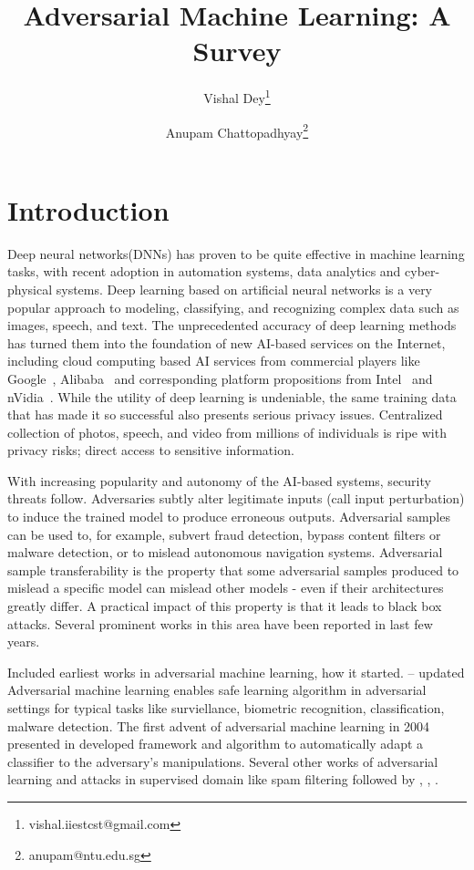 \documentclass{article}
\title{Adversarial Machine Learning: A Survey}
\author[1]{Vishal Dey\thanks{vishal.iiestcst@gmail.com}}
\author[2]{Anupam Chattopadhyay\thanks{anupam@ntu.edu.sg}}
\affil[1]{Department of Computer Science and Technology,  Indian Institute of Engineering Science and Technology, Shibpur}
\affil[2]{School of Computer Science and Engineering, Nanyang Technological University, Singapore}
\newcommand{\ach}[1]{{\color{red}#1}}
\begin{document}
	\maketitle
	
\section{Introduction}
Deep neural networks(DNNs) has proven to be quite effective in machine learning tasks, with recent adoption in automation systems, data analytics and cyber-physical systems. Deep learning based on artificial neural networks is a very popular approach to modeling, classifying, and recognizing complex data such as images, speech, and text. The unprecedented accuracy of deep learning methods has turned them into the foundation of new AI-based services on the Internet, including cloud computing based AI services from commercial players like Google~\cite{google_cloud}, Alibaba~\cite{alibaba_cloud} and corresponding platform propositions from Intel~\cite{intel_cloud} and nVidia~\cite{nvidia_cloud}. While the utility of deep learning is undeniable, the same training data that has made it so successful also presents serious privacy issues. Centralized collection of photos, speech, and video from millions of individuals is ripe with privacy risks; direct access to sensitive information.

With increasing popularity and autonomy of the AI-based systems, security threats follow. Adversaries subtly alter legitimate inputs (call input perturbation) to induce the trained model to produce erroneous outputs. Adversarial samples can be used to, for example, subvert fraud detection, bypass content filters or malware detection, or to mislead autonomous navigation systems. Adversarial sample transferability is the property that some adversarial samples produced to mislead a specific model can mislead other models - even if their architectures greatly differ. A practical impact of this property is that it leads to black box attacks. Several prominent works in this area have been reported in last few years. 

\ach{Included earliest works in adversarial machine learning, how it started. -- updated}
Adversarial machine learning enables safe learning algorithm in adversarial settings for typical tasks like surviellance, biometric recognition, classification, malware detection. The first advent of adversarial machine learning in 2004 presented in \cite{dalvi2004adversarial} developed framework and algorithm to automatically adapt a classifier to the adversary's manipulations. Several other works of adversarial learning and attacks in supervised domain like spam filtering followed by \cite{lowd2005adversarial}, \cite{biggio2008adversarial}, \cite{biggio2014security}.
\end{document}

